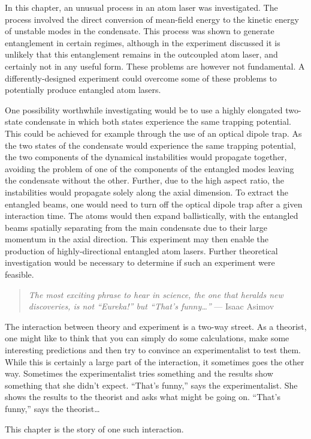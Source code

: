 In this chapter, an unusual process in an atom laser was investigated.  The process involved the direct conversion of mean-field energy to the kinetic energy of unstable modes in the condensate.  This process was shown to generate entanglement in certain regimes, although in the experiment discussed it is unlikely that this entanglement remains in the outcoupled atom laser, and certainly not in any useful form.  These problems are however not fundamental.  A differently-designed experiment could overcome some of these problems to potentially produce entangled atom lasers.

One possibility worthwhile investigating would be to use a highly elongated two-state condensate in which both states experience the same trapping potential.  This could be achieved for example through the use of an optical dipole trap.  As the two states of the condensate would experience the same trapping potential, the two components of the dynamical instabilities would propagate together, avoiding the problem of one of the components of the entangled modes leaving the condensate without the other.  Further, due to the high aspect ratio, the instabilities would propagate solely along the axial dimension.  To extract the entangled beams, one would need to turn off the optical dipole trap after a given interaction time.  The atoms would then expand ballistically, with the entangled beams spatially separating from the main condensate due to their large momentum in the axial direction.  This experiment may then enable the production of highly-directional entangled atom lasers.  Further theoretical investigation would be necessary to determine if such an experiment were feasible.

\parasep

\begin{quote}
    \emph{The most exciting phrase to hear in science, the one that heralds new discoveries, is not ``Eureka!'' but ``That's funny\dots''} --- Isaac Asimov
\end{quote}

The interaction between theory and experiment is a two-way street.  As a theorist, one might like to think that you can simply do some calculations, make some interesting predictions and then try to convince an experimentalist to test them.  While this is certainly a large part of the interaction, it sometimes goes the other way.  Sometimes the experimentalist tries something and the results show something that she didn't expect. ``That's funny,'' says the experimentalist.  She shows the results to the theorist and asks what might be going on.  ``That's funny,'' says the theorist\dots

This chapter is the story of one such interaction.



